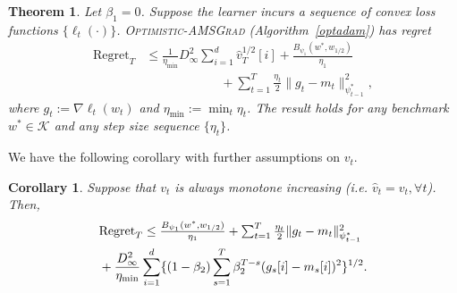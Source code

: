 \documentclass[11pt]{article}
\def\K{\mathcal{K}}
\newtheorem{Theorem}{Theorem}
\newtheorem{Corollary}{Corollary}
\theoremstyle{k}
\begin{document}
\begin{Theorem} \label{thm:main}
Let $\beta_{1}=0$. Suppose the learner incurs a sequence of convex loss functions $\{ \ell_{t}(\cdot) \}$.
\textsc{Optimistic-AMSGrad} (Algorithm~\ref{optadam}) 
has regret 
\begin{equation} \label{bound:optada}
\begin{aligned}
\textstyle
 \text{Regret}_T & \textstyle
 \leq
  \frac{1}{\eta_{\min}} D_{\infty}^2 
\sum_{i=1}^d \hat{v}_{T}^{1/2}[i]
+ \frac{ B_{\psi_1}(w^*, w_{1/2})}{\eta_1} \\
&\hspace{1in}+
 \sum_{t=1}^T
\frac{\eta_t}{2} \| g_t - m_t  \|_{\psi_{t-1}^*}^2 ,
\end{aligned}
\end{equation}
where $g_{t}:= \nabla \ell_{t}(w_t)$ and $\eta_{{\min}} := \min_{{t}} \eta_{t}$.
The result holds for any benchmark $w^{*} \in \K$ and any step size sequence $\{ \eta_t \}$.
\end{Theorem}
We have the following corollary with further assumptions on $v_t$.
\begin{Corollary}
Suppose that $v_{t}$ is always monotone increasing (i.e. $\hat{v}_t = v_t, \forall t$).
Then, 
\begin{equation} \label{bc}
\begin{aligned}
\textstyle & \textstyle \text{Regret}_T \leq 
  \textstyle
 \frac{ B_{\psi_1}(w^*, w_{1/2}) 
}{\eta_1} 
+
\sum_{t=1}^T
\frac{\eta_t}{2} \|g_t - m_t  \|_{\psi_{t-1}^*}^2 \\
&+\frac{D_{\infty}^2}{\eta_{\min}} \sum_{i=1}^d \{ (1-\beta_2) \sum_{s=1}^{T} \beta_2^{T-s} (g_s[i] - m_s[i])^2 \}^{1/2}.
\end{aligned}
\end{equation}
\end{Corollary}
\end{document}

